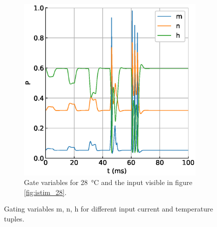 \documentclass{scrartcl}			%
\begin{document}
\begin{figure}[H]
\begin{subfigure}[b]{0.5\linewidth}
    \includegraphics[width=\linewidth]{imgs/gates_at_28.eps} 
    \caption{Gate variables for \SI{28}{\celsius} and the input visible in figure \ref{fig:istim_28}.} 
    \label{fig:gates_28} 
    \end{subfigure} 
  \caption{Gating variables m, n, h for different input current and temperature tuples.}
  \label{fig:gates} 
\end{figure}
\end{document}
